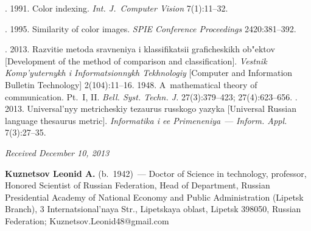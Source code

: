 \begin{multicols}{2}
{{\begin{thebibliography}{99}
. 1991. Color indexing.
\textit{Int. J.~Computer Vision} 7(1):11--32.

. 1995. Similarity of color images.
\textit{SPIE Conference Proceedings} 2420:381--392.

. 2013. Razvitie metoda sravneniya i
klassifikatsii graficheskikh ob"ektov
[Development of the method of comparison and classification].
\textit{Vestnik Komp'yuternykh i Informatsionnykh Tekhnologiy}
[Computer and Information Bulletin Technology] 2(104):11--16.
 1948. A~mathematical theory of communication. Pt.~I, II.
\textit{Bell. Syst. Techn. J.} 27(3):379--423; 27(4):623--656.
.
2013. Universal'nyy metricheskiy tezaurus russkogo yazyka
[Universal Russian language thesaurus metric].
\textit{Informatika i ee Primeneniya}~--- \textit{Inform. Appl.} 7(3):27--35.

\end{thebibliography}
} }


\end{multicols}

\vspace*{-6pt}

\hfill{\small\textit{Received December 10, 2013}}

\vspace*{-18pt}



\Contrl

\noindent
\textbf{Kuznetsov Leonid A.} (b.\ 1942)~--- Doctor of Science in technology,
professor, Honored Scientist of Russian Federation,
Head of Department, Russian Presidential Academy of National
Economy and Public Administration (Lipetsk Branch),
3 Internatsional'naya Str., Lipetskaya oblast, Lipetsk 398050,
Russian Federation; Kuznetsov.Leonid48@gmail.com




 \label{end\stat}

\renewcommand{\bibname}{\protect\rm Литература}
